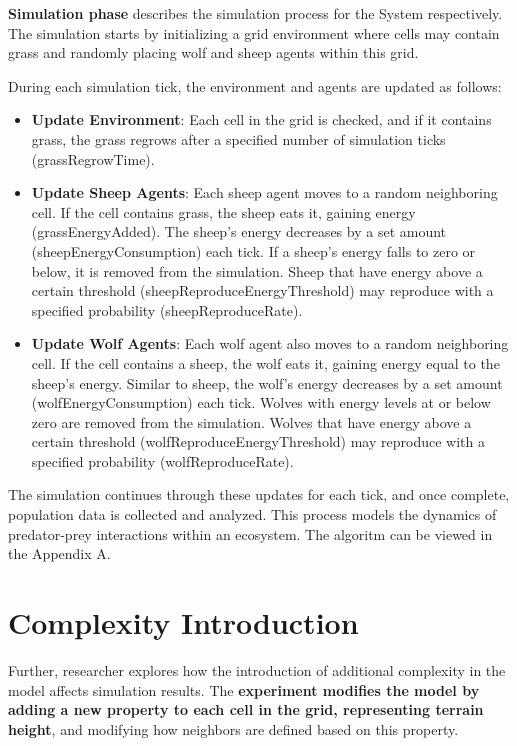 \documentclass[12pt,a4paper]{article}
\begin{document}
\vspace{2mm}

\textbf{Simulation phase} describes the simulation process for the System respectively. The simulation starts by initializing a grid environment where cells may contain grass and randomly placing wolf and sheep agents within this grid.

During each simulation tick, the environment and agents are updated as follows:
\begin{itemize}
    \item \textbf{Update Environment}: Each cell in the grid is checked, and if it contains grass, the grass regrows after a specified number of simulation ticks (grassRegrowTime).

    \item \textbf{Update Sheep Agents}: Each sheep agent moves to a random neighboring cell. If the cell contains grass, the sheep eats it, gaining energy (grassEnergyAdded). The sheep’s energy decreases by a set amount (sheepEnergyConsumption) each tick. If a sheep's energy falls to zero or below, it is removed from the simulation. Sheep that have energy above a certain threshold (sheepReproduceEnergyThreshold) may reproduce with a specified probability (sheepReproduceRate).

    \item \textbf{Update Wolf Agents}: Each wolf agent also moves to a random neighboring cell. If the cell contains a sheep, the wolf eats it, gaining energy equal to the sheep's energy. Similar to sheep, the wolf's energy decreases by a set amount (wolfEnergyConsumption) each tick. Wolves with energy levels at or below zero are removed from the simulation. Wolves that have energy above a certain threshold (wolfReproduceEnergyThreshold) may reproduce with a specified probability (wolfReproduceRate).
\end{itemize}

The simulation continues through these updates for each tick, and once complete, population data is collected and analyzed. This process models the dynamics of predator-prey interactions within an ecosystem. The algoritm can be viewed in the Appendix A.

\section{Complexity Introduction}

Further, researcher explores how the introduction of additional complexity in the model affects simulation results. The \textbf{experiment modifies the model by adding a new property to each cell in the grid, representing terrain height}, and modifying how neighbors are defined based on this property.
\end{document}
